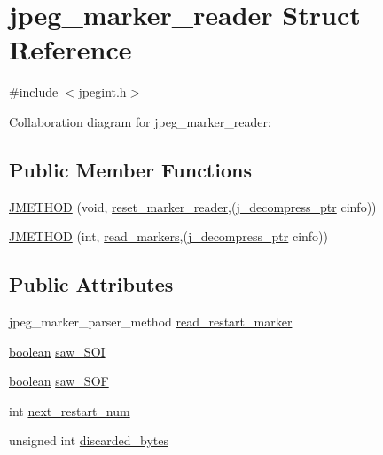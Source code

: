 \hypertarget{structjpeg__marker__reader}{}\section{jpeg\+\_\+marker\+\_\+reader Struct Reference}
\label{structjpeg__marker__reader}


{\ttfamily \#include $<$jpegint.\+h$>$}



Collaboration diagram for jpeg\+\_\+marker\+\_\+reader\+:
\subsection*{Public Member Functions}
\begin{DoxyCompactItemize}
\item 
\mbox{\hyperlink{structjpeg__marker__reader_af23250da87f9da190c88459aa565f2b1}{J\+M\+E\+T\+H\+OD}} (void, \mbox{\hyperlink{jdmarker_8c_a1c08f1ba460e1a19d2dbc877b47c8b5f}{reset\+\_\+marker\+\_\+reader}},(\mbox{\hyperlink{jpeglib_8h_a00c7d78af44bd26a901c791ccfc1e178}{j\+\_\+decompress\+\_\+ptr}} cinfo))
\item 
\mbox{\hyperlink{structjpeg__marker__reader_a6a2541cbeb37477c71ba6bc237e559a1}{J\+M\+E\+T\+H\+OD}} (int, \mbox{\hyperlink{jdmarker_8c_a8ff81a078a99e98efe6051366512c5f6}{read\+\_\+markers}},(\mbox{\hyperlink{jpeglib_8h_a00c7d78af44bd26a901c791ccfc1e178}{j\+\_\+decompress\+\_\+ptr}} cinfo))
\end{DoxyCompactItemize}
\subsection*{Public Attributes}
\begin{DoxyCompactItemize}
\item 
jpeg\+\_\+marker\+\_\+parser\+\_\+method \mbox{\hyperlink{structjpeg__marker__reader_a23e67f5a0fa37ea69483dad72217123e}{read\+\_\+restart\+\_\+marker}}
\item 
\mbox{\hyperlink{jmorecfg_8h_a7c6368b321bd9acd0149b030bb8275ed}{boolean}} \mbox{\hyperlink{structjpeg__marker__reader_ad67711d91054e97e76fbe5254aac644c}{saw\+\_\+\+S\+OI}}
\item 
\mbox{\hyperlink{jmorecfg_8h_a7c6368b321bd9acd0149b030bb8275ed}{boolean}} \mbox{\hyperlink{structjpeg__marker__reader_a1bf77ef7dfb6dfe58a03d041eb0dcd40}{saw\+\_\+\+S\+OF}}
\item 
int \mbox{\hyperlink{structjpeg__marker__reader_aac8d40171c73a18f129cd1b62d2fd06b}{next\+\_\+restart\+\_\+num}}
\item 
unsigned int \mbox{\hyperlink{structjpeg__marker__reader_ad29dee6159ab74f195fe5d88139306ce}{discarded\+\_\+bytes}}
\end{DoxyCompactItemize}



